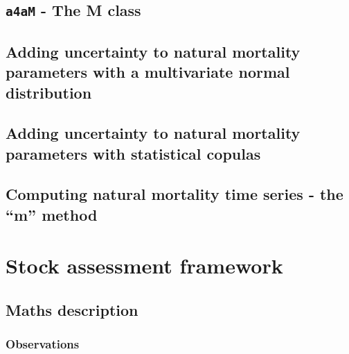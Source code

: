 \documentclass[
]{book}
\begin{document}
\hypertarget{a4am---the-m-class}{%
\section{\texorpdfstring{\texttt{a4aM} - The M class}{a4aM - The M class}}\label{a4am---the-m-class}}

\hypertarget{adding-uncertainty-to-natural-mortality-parameters-with-a-multivariate-normal-distribution}{%
\section{Adding uncertainty to natural mortality parameters with a multivariate normal distribution}\label{adding-uncertainty-to-natural-mortality-parameters-with-a-multivariate-normal-distribution}}

\hypertarget{adding-uncertainty-to-natural-mortality-parameters-with-statistical-copulas}{%
\section{Adding uncertainty to natural mortality parameters with statistical copulas}\label{adding-uncertainty-to-natural-mortality-parameters-with-statistical-copulas}}

\hypertarget{computing-natural-mortality-time-series---the-m-method}{%
\section{Computing natural mortality time series - the ``m'' method}\label{computing-natural-mortality-time-series---the-m-method}}

\hypertarget{stock-assessment-framework}{%
\chapter{Stock assessment framework}\label{stock-assessment-framework}}

\hypertarget{maths-description}{%
\section{\texorpdfstring{Maths description \label{sec:math}}{Maths description }}\label{maths-description}}

\hypertarget{observations}{%
\subsection{Observations}\label{observations}}
\end{document}
